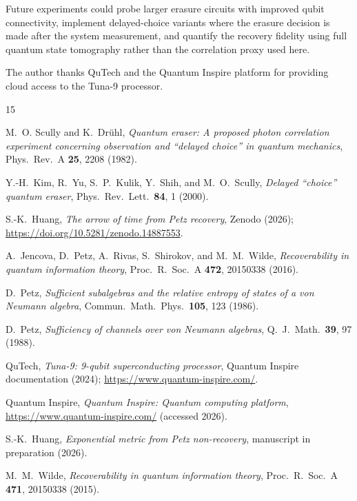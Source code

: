 \documentclass[prl,twocolumn,superscriptaddress,longbibliography,floatfix]{revtex4-2}
\begin{document}
Future experiments could probe larger erasure circuits with improved
qubit connectivity, implement delayed-choice variants where the
erasure decision is made after the system measurement, and quantify
the recovery fidelity using full quantum state tomography rather than
the correlation proxy used here.

\begin{acknowledgments}
The author thanks QuTech and the Quantum Inspire platform for
providing cloud access to the Tuna-9 processor.
\end{acknowledgments}

\begin{thebibliography}{15}

M.~O. Scully and K.~Dr\"{u}hl,
\textit{Quantum eraser: A proposed photon correlation experiment
concerning observation and ``delayed choice'' in quantum mechanics},
Phys.\ Rev.\ A \textbf{25}, 2208 (1982).

Y.-H.~Kim, R.~Yu, S.~P.~Kulik, Y.~Shih, and M.~O.~Scully,
\textit{Delayed ``choice'' quantum eraser},
Phys.\ Rev.\ Lett.\ \textbf{84}, 1 (2000).

S.-K.~Huang,
\textit{The arrow of time from Petz recovery},
Zenodo (2026); \url{https://doi.org/10.5281/zenodo.14887553}.

A.~Jencova, D.~Petz, A.~Rivas, S.~Shirokov, and M.~M.~Wilde,
\textit{Recoverability in quantum information theory},
Proc.\ R.\ Soc.\ A \textbf{472}, 20150338 (2016).

D.~Petz,
\textit{Sufficient subalgebras and the relative entropy of states
of a von Neumann algebra},
Commun.\ Math.\ Phys.\ \textbf{105}, 123 (1986).

D.~Petz,
\textit{Sufficiency of channels over von Neumann algebras},
Q.\ J.\ Math.\ \textbf{39}, 97 (1988).

QuTech,
\textit{Tuna-9: 9-qubit superconducting processor},
Quantum Inspire documentation (2024);
\url{https://www.quantum-inspire.com/}.

Quantum Inspire,
\textit{Quantum Inspire: Quantum computing platform},
\url{https://www.quantum-inspire.com/} (accessed 2026).

S.-K.~Huang,
\textit{Exponential metric from Petz non-recovery},
manuscript in preparation (2026).

M.~M.~Wilde,
\textit{Recoverability in quantum information theory},
Proc.\ R.\ Soc.\ A \textbf{471}, 20150338 (2015).


\end{thebibliography}
\end{document}
